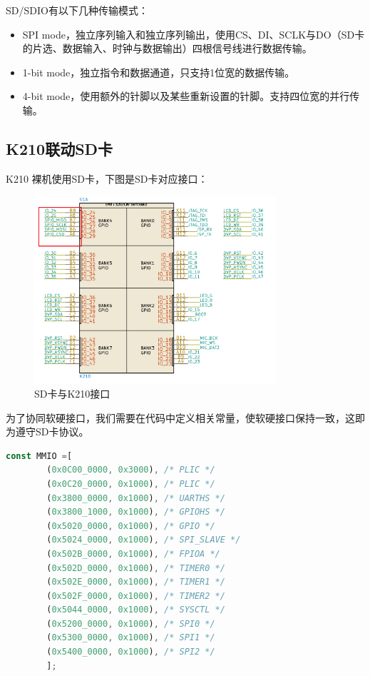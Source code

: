 SD/SDIO有以下几种传输模式：
\begin{itemize}
	\item SPI mode，独立序列输入和独立序列输出，使用CS、DI、SCLK与DO（SD卡的片选、数据输入、时钟与数据输出）四根信号线进行数据传输。
	\item 1-bit mode，独立指令和数据通道，只支持1位宽的数据传输。
	\item 4-bit mode，使用额外的针脚以及某些重新设置的针脚。支持四位宽的并行传输。
\end{itemize}

\subsection{K210联动SD卡}

K210 裸机使用SD卡，下图是SD卡对应接口：
\begin{figure}[H]
    \centering
    \includegraphics[width=0.8\textwidth]{figures/06-02-接口标.png}
    \caption{SD卡与K210接口}
\end{figure}

为了协同软硬接口，我们需要在代码中定义相关常量，使软硬接口保持一致，这即为遵守SD卡协议。
\begin{lstlisting}[language={Rust}, label={code:inode},
	caption={SD卡协议}]
    const MMIO =[
        (0x0C00_0000, 0x3000), /* PLIC */
        (0x0C20_0000, 0x1000), /* PLIC */
        (0x3800_0000, 0x1000), /* UARTHS */
        (0x3800_1000, 0x1000), /* GPIOHS */
        (0x5020_0000, 0x1000), /* GPIO */
        (0x5024_0000, 0x1000), /* SPI_SLAVE */
        (0x502B_0000, 0x1000), /* FPIOA */
        (0x502D_0000, 0x1000), /* TIMER0 */
        (0x502E_0000, 0x1000), /* TIMER1 */
        (0x502F_0000, 0x1000), /* TIMER2 */
        (0x5044_0000, 0x1000), /* SYSCTL */
        (0x5200_0000, 0x1000), /* SPI0 */
        (0x5300_0000, 0x1000), /* SPI1 */
        (0x5400_0000, 0x1000), /* SPI2 */
        ];
\end{lstlisting}


